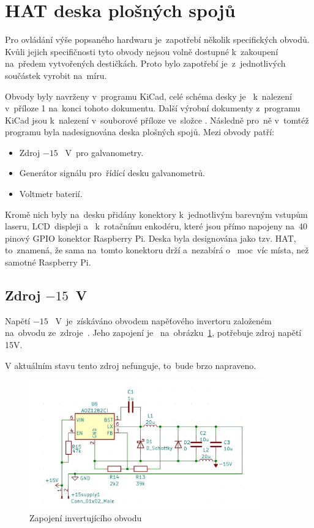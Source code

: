 \section{HAT deska plošných spojů}
Pro ovládání výše popsaného hardwaru je~zapotřebí několik specifických obvodů.
Kvůli jejich specifičnosti tyto obvody nejsou volně dostupné k~zakoupení na~předem vytvořených destičkách. Proto bylo zapotřebí je~z~jednotlivých součástek vyrobit na~míru.

Obvody byly navrženy v~programu KiCad, celé schéma desky je ~k~nalezení v~příloze 1 na~konci tohoto dokumentu. Další výrobní dokumenty z~programu KiCad jsou k~nalezení v~souborové příloze ve~složce . Následně pro~ně v~tomtéž programu byla nadesignována deska plošných spojů. Mezi obvody patří:
\begin{itemize}
  \item Zdroj $-15$ ~V~pro galvanometry.
  \item Generátor signálu pro~řídící desku galvanometrů.
  \item Voltmetr baterií.
\end{itemize}

Kromě nich byly na~desku přidány konektory k~jednotlivým barevným vstupům laseru, LCD~displeji a ~k~rotačnímu enkodéru, které jsou přímo napojeny na~40 pinový GPIO konektor Raspberry Pi.
Deska byla designována jako tzv. HAT, to~znamená, že sama na~tomto konektoru drží a~nezabírá o ~moc~víc místa, než samotné Raspberry Pi.

\subsection{Zdroj $-15$~V}\label{sec:negative-ps}
Napětí $-15$ ~V~je~získáváno obvodem napěťového invertoru založeném na~obvodu ze~zdroje~\cite{ampalyzer}. Jeho zapojení je ~na~obrázku~\ref{fig:negative-ps}, potřebuje zdroj napětí 15V.

V aktuálním stavu tento zdroj nefunguje, to~bude brzo napraveno.

\begin{figure}[htb]
  \centering
  \includegraphics[width=0.9\textwidth]{img/negative-ps.jpg}
  \caption{\label{fig:negative-ps} Zapojení invertujícího obvodu}
\end{figure}

